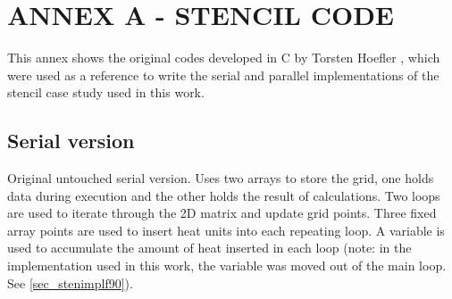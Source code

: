 \renewcommand{\thechapter}{A}
\chapter{ANNEX A - STENCIL CODE}
\label{annexA}

This annex shows the original codes developed in C by Torsten Hoefler \cite {Balaji2017}, which were used as a reference to write the serial and parallel implementations of the stencil case study used in this work.

\section{Serial version}
\label{ann_bljser}

Original untouched serial version. Uses two arrays to store the grid, one holds data during execution and the other holds the result of calculations. Two loops are used to iterate through the 2D matrix and update grid points. Three fixed array points are used to insert heat units into each repeating loop. A variable is used to accumulate the amount of heat inserted in each loop (note: in the implementation used in this work, the variable was moved out of the main loop. See \autoref{sec_stenimplf90}).

